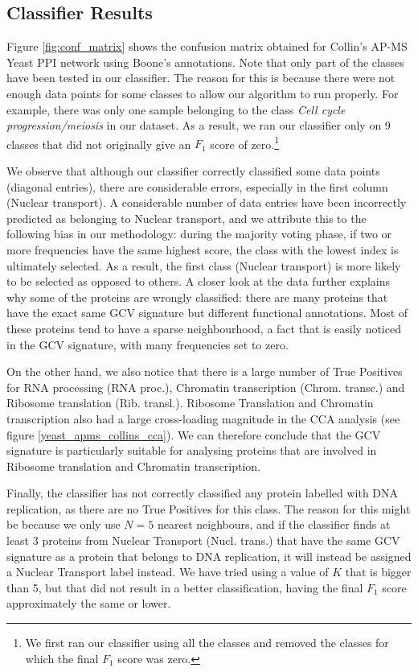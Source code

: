 \subsection{Classifier Results}


Figure \ref{fig:conf_matrix} shows the confusion matrix obtained for Collin's AP-MS Yeast PPI network using Boone's annotations. Note that only part of the classes have been tested in our classifier. The reason for this is because there were not enough data points for some classes to allow our algorithm to run properly. For example, there was only one sample belonging to the class \emph{Cell cycle progression/meiosis} in our dataset. As a result, we ran our classifier only on 9 classes that did not originally give an $F_1$ score of zero.\footnote{We first ran our classifier using all the classes and removed the classes for which the final $F_1$ score was zero.}

We observe that although our classifier correctly classified some data points (diagonal entries), there are considerable errors, especially in the first column (Nuclear transport). A considerable number of data entries have been incorrectly predicted as belonging to Nuclear transport, and we attribute this to the following bias in our methodology: during the majority voting phase, if two or more frequencies have the same highest score, the class with the lowest index is ultimately selected. As a result, the first class (Nuclear transport) is more likely to be selected as 
opposed to others. A closer look at the data further explains why some of the proteins are wrongly classified: there are many proteins that have the exact same GCV signature but different functional annotations. Most of these proteins tend to have a sparse neighbourhood, a fact that is easily noticed in the GCV signature, with many frequencies set to zero. 

On the other hand, we also notice that there is a large number of True Positives for RNA processing (RNA proc.), Chromatin transcription (Chrom. transc.) and Ribosome translation (Rib. transl.). Ribosome Translation and Chromatin transcription also had a large cross-loading magnitude in the CCA analysis (see figure \ref{yeast_apms_collins_cca}). We can therefore conclude that the GCV signature is particularly suitable for analysing proteins that are involved in Ribosome translation and Chromatin transcription.

Finally, the classifier has not correctly classified any protein labelled with DNA replication, as there are no True Positives for this class. The reason for this might be because we only use $N = 5$ nearest neighbours, and if the classifier finds at least 3 proteins from Nuclear Transport (Nucl. trans.) that have the same GCV signature as a protein that belongs to DNA replication, it will instead be assigned a Nuclear Transport label instead. We have tried using a value of $K$ that is bigger than 5, but that did not result in a better classification, having the final $F_1$ score approximately the same or lower.

